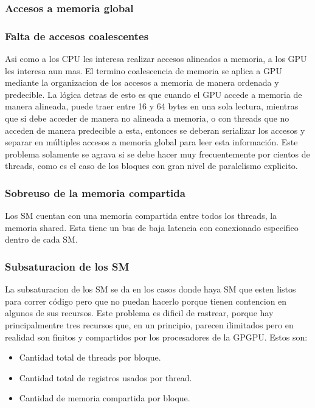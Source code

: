 \subsubsection{Accesos a memoria global}

\subsubsection{Falta de accesos coalescentes}
Asi como a los CPU les interesa realizar accesos alineados a memoria, a los GPU les
interesa aun mas. El termino coalescencia de memoria se aplica a GPU mediante
la organizacion de los accesos a memoria de manera ordenada y predecible. La l\'ogica
detras de esto es que cuando el GPU accede a memoria de manera alineada, puede traer
entre 16 y 64 bytes en una sola lectura, mientras que si debe acceder de manera no
alineada a memoria, o con threads que no acceden de manera predecible a esta, entonces
se deberan serializar los accesos y separar en m\'ultiples accesos a memoria global para leer
esta informaci\'on. Este problema solamente se agrava si se debe hacer muy frecuentemente
por cientos de threads, como es el caso de los bloques con gran nivel de paralelismo explicito.

\subsubsection{Sobreuso de la memoria compartida}

Los SM cuentan con una memoria compartida entre todos los threads, la memoria shared. Esta
tiene un bus de baja latencia con conexionado especifico dentro de cada SM.

\subsubsection{Subsaturacion de los SM}
La subsaturacion de los SM se da en los casos donde haya SM que esten listos para correr
c\'odigo pero que no puedan hacerlo porque tienen contencion en algunos de sus recursos.
Este problema es dificil de rastrear, porque hay principalmentre tres recursos que,
en un principio, parecen ilimitados pero en realidad son finitos y compartidos por
los procesadores de la GPGPU. Estos son:
\begin{itemize}
\item Cantidad total de threads por bloque.
\item Cantidad total de registros usados por thread.
\item Cantidad de memoria compartida por bloque.
\end{itemize}

